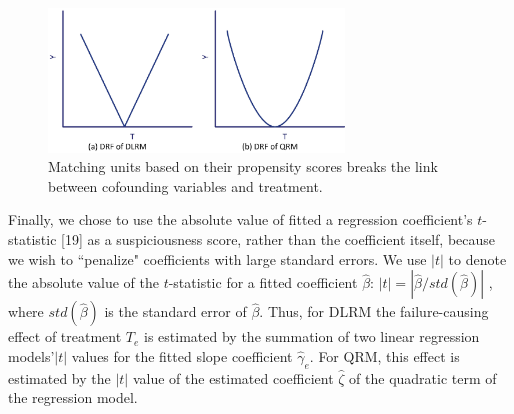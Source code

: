\begin{figure}[!thpb]
\centering
\includegraphics[width=0.7\textwidth]{DRF_curves.eps}
\caption{Matching units based on their propensity scores breaks the link between cofounding variables and treatment.}
\label{DRF_curves}
\end{figure}
\vspace{-0.1cm}

Finally, we chose to use the absolute value of fitted a regression coefficient's $t$-statistic [19] as a suspiciousness score, rather than the coefficient itself, because we wish to ``penalize" coefficients with large standard errors.  We use $\left| t \right|$ to denote the absolute value of the $t$-statistic for a fitted coefficient $\hat \beta $: $\left| t \right| = |\hat \beta /std ( {\hat \beta })|$ , where $std(\hat \beta)$ is the standard error of $\hat \beta$.  Thus, for DLRM the failure-causing effect of treatment $T_e$ is estimated by the summation of two linear regression models'$\left| t \right|$ values for the fitted slope coefficient ${{\hat \gamma }_e}$.  For QRM, this effect is estimated by the $\left| t \right|$ value of the estimated coefficient ${\hat \zeta }$ of the quadratic term of the regression model.

